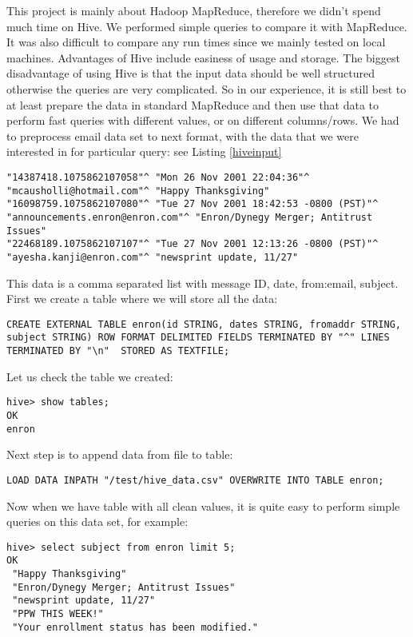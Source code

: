 \documentclass{llncs}
\begin{document}
This project is mainly about Hadoop MapReduce, therefore we didn't spend much time on Hive. We performed simple queries to compare it with MapReduce. It was also difficult to compare any run times since we mainly tested on local machines. Advantages of Hive include easiness of usage and storage. The biggest disadvantage of using Hive is that the input data should be well structured otherwise the queries are very complicated. So in our experience, it is still best to at least prepare the data in standard MapReduce and then use that data to perform fast queries with different values, or on different columns/rows. We had to preprocess email data set to next format, with the data that we were interested in for particular query: see Listing \ref{hiveinput}\\
\begin{lstlisting}[caption={What data looks like prepared for hive}, label={hiveinput}]
"14387418.1075862107058"^ "Mon 26 Nov 2001 22:04:36"^ "mcausholli@hotmail.com"^ "Happy Thanksgiving"
"16098759.1075862107080"^ "Tue 27 Nov 2001 18:42:53 -0800 (PST)"^ "announcements.enron@enron.com"^ "Enron/Dynegy Merger; Antitrust Issues"
"22468189.1075862107107"^ "Tue 27 Nov 2001 12:13:26 -0800 (PST)"^ "ayesha.kanji@enron.com"^ "newsprint update, 11/27"
\end{lstlisting}
This data is a comma separated list with message ID, date, from:email, subject.
First we create a table where we will store all the data:
\begin{lstlisting}[caption={Hive query for creating table}, label={hivequery}]
CREATE EXTERNAL TABLE enron(id STRING, dates STRING, fromaddr STRING, subject STRING) ROW FORMAT DELIMITED FIELDS TERMINATED BY "^" LINES TERMINATED BY "\n"  STORED AS TEXTFILE;
\end{lstlisting}
Let us check the table we created:
\begin{lstlisting}
hive> show tables;
OK
enron
\end{lstlisting}
Next step is to append data from file to table:
\begin{lstlisting}
LOAD DATA INPATH "/test/hive_data.csv" OVERWRITE INTO TABLE enron;
\end{lstlisting}
Now when we have table with all clean values, it is quite easy to perform simple queries on this data set, for example:
\begin{lstlisting}
hive> select subject from enron limit 5;
OK
 "Happy Thanksgiving"
 "Enron/Dynegy Merger; Antitrust Issues"
 "newsprint update, 11/27"
 "PPW THIS WEEK!"
 "Your enrollment status has been modified."
\end{lstlisting}
\end{document}
